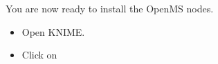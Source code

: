 \noindent You are now ready to install the OpenMS nodes.

\begin{itemize}
	\item Open KNIME.
	\item Click on 
\end{itemize}
%

